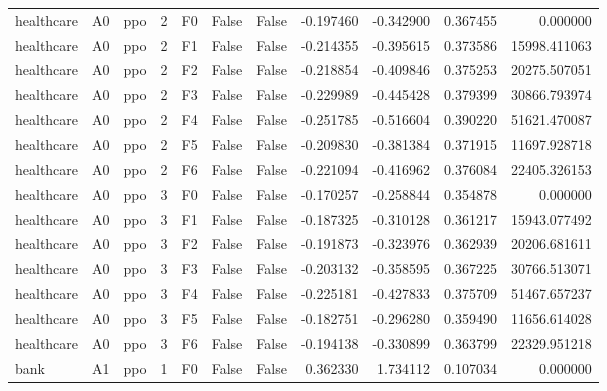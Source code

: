 \begin{tabular}{lllrlllrrrr}
healthcare &      A0 &       ppo &     2 &  F0 &           False &            False & -0.197460 & -0.342900 & 0.367455 &         0.000000 \\
healthcare &      A0 &       ppo &     2 &  F1 &           False &            False & -0.214355 & -0.395615 & 0.373586 &     15998.411063 \\
healthcare &      A0 &       ppo &     2 &  F2 &           False &            False & -0.218854 & -0.409846 & 0.375253 &     20275.507051 \\
healthcare &      A0 &       ppo &     2 &  F3 &           False &            False & -0.229989 & -0.445428 & 0.379399 &     30866.793974 \\
healthcare &      A0 &       ppo &     2 &  F4 &           False &            False & -0.251785 & -0.516604 & 0.390220 &     51621.470087 \\
healthcare &      A0 &       ppo &     2 &  F5 &           False &            False & -0.209830 & -0.381384 & 0.371915 &     11697.928718 \\
healthcare &      A0 &       ppo &     2 &  F6 &           False &            False & -0.221094 & -0.416962 & 0.376084 &     22405.326153 \\
healthcare &      A0 &       ppo &     3 &  F0 &           False &            False & -0.170257 & -0.258844 & 0.354878 &         0.000000 \\
healthcare &      A0 &       ppo &     3 &  F1 &           False &            False & -0.187325 & -0.310128 & 0.361217 &     15943.077492 \\
healthcare &      A0 &       ppo &     3 &  F2 &           False &            False & -0.191873 & -0.323976 & 0.362939 &     20206.681611 \\
healthcare &      A0 &       ppo &     3 &  F3 &           False &            False & -0.203132 & -0.358595 & 0.367225 &     30766.513071 \\
healthcare &      A0 &       ppo &     3 &  F4 &           False &            False & -0.225181 & -0.427833 & 0.375709 &     51467.657237 \\
healthcare &      A0 &       ppo &     3 &  F5 &           False &            False & -0.182751 & -0.296280 & 0.359490 &     11656.614028 \\
healthcare &      A0 &       ppo &     3 &  F6 &           False &            False & -0.194138 & -0.330899 & 0.363799 &     22329.951218 \\
      bank &      A1 &       ppo &     1 &  F0 &           False &            False &  0.362330 &  1.734112 & 0.107034 &         0.000000 \\

\end{tabular}
